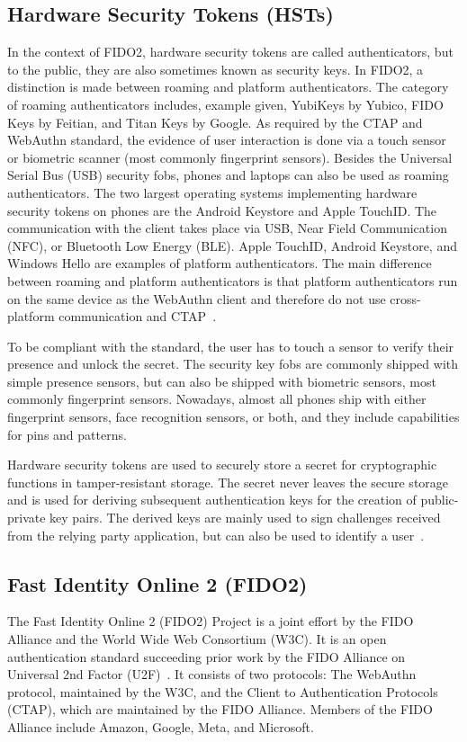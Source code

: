 \documentclass[runningheads]{llncs}
\begin{document}
\subsection{Hardware Security Tokens (HSTs)}
In the context of FIDO2, hardware security tokens are called authenticators, but to the public, they are also sometimes known as security keys. In FIDO2, a distinction is made between roaming and platform authenticators. The category of roaming authenticators includes, example given, YubiKeys by Yubico, FIDO Keys by Feitian, and Titan Keys by Google. As required by the CTAP and WebAuthn standard, the evidence of user interaction is done via a touch sensor or biometric scanner (most commonly fingerprint sensors). Besides the Universal Serial Bus (USB) security fobs, phones and laptops can also be used as roaming authenticators. The two largest operating systems implementing hardware security tokens on phones are the Android Keystore and Apple TouchID. The communication with the client takes place via USB, Near Field Communication (NFC), or Bluetooth Low Energy (BLE).
Apple TouchID, Android Keystore, and Windows Hello are examples of platform authenticators. The main difference between roaming and platform authenticators is that platform authenticators run on the same device as the WebAuthn client and therefore do not use cross-platform communication and CTAP~\cite{9152694}. 

To be compliant with the standard, the user has to touch a sensor to verify their presence and unlock the secret. The security key fobs are commonly shipped with simple presence sensors, but can also be shipped with biometric sensors, most commonly fingerprint sensors. Nowadays, almost all phones ship with either fingerprint sensors, face recognition sensors, or both, and they include capabilities for pins and patterns.

Hardware security tokens are used to securely store a secret for cryptographic functions in tamper-resistant storage. The secret never leaves the secure storage and is used for deriving subsequent authentication keys for the creation of public-private key pairs. The derived keys are mainly used to sign challenges received from the relying party application, but can also be used to identify a user~\cite{272198}.

\subsection{Fast Identity Online 2 (FIDO2)}
The Fast Identity Online 2 (FIDO2) Project is a joint effort by the FIDO Alliance and the World Wide Web Consortium (W3C). It is an open authentication standard succeeding prior work by the FIDO Alliance on Universal 2nd Factor (U2F)~\cite{9152694}. It consists of two protocols: The WebAuthn protocol, maintained by the W3C, and the Client to Authentication Protocols (CTAP), which are maintained by the FIDO Alliance. Members of the FIDO Alliance include Amazon, Google, Meta, and Microsoft.
\end{document}
